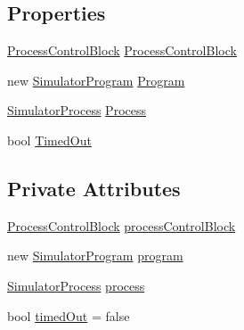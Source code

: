 \subsection*{Properties}
\begin{DoxyCompactItemize}
\item 
\hyperlink{class_c_p_u___o_s___simulator_1_1_operating___system_1_1_process_control_block}{Process\+Control\+Block} \hyperlink{class_c_p_u___o_s___simulator_1_1_operating___system_1_1_process_execution_unit_a50dccf62e2bc43d1ad30f6488d3ffa58}{Process\+Control\+Block}
\item 
new \hyperlink{class_c_p_u___o_s___simulator_1_1_c_p_u_1_1_simulator_program}{Simulator\+Program} \hyperlink{class_c_p_u___o_s___simulator_1_1_operating___system_1_1_process_execution_unit_ad5ee10381cd66c0681f1a7be91b679e4}{Program}
\item 
\hyperlink{class_c_p_u___o_s___simulator_1_1_operating___system_1_1_simulator_process}{Simulator\+Process} \hyperlink{class_c_p_u___o_s___simulator_1_1_operating___system_1_1_process_execution_unit_a869fb898b0a61e168220757d921e5bfc}{Process}
\item 
bool \hyperlink{class_c_p_u___o_s___simulator_1_1_operating___system_1_1_process_execution_unit_aa507b44c8134ffd0e9fbe702e1bf9e32}{Timed\+Out}
\end{DoxyCompactItemize}
\subsection*{Private Attributes}
\begin{DoxyCompactItemize}
\item 
\hyperlink{class_c_p_u___o_s___simulator_1_1_operating___system_1_1_process_control_block}{Process\+Control\+Block} \hyperlink{class_c_p_u___o_s___simulator_1_1_operating___system_1_1_process_execution_unit_ae2624c872da8f348b1a9fcba8d6734cf}{process\+Control\+Block}
\item 
new \hyperlink{class_c_p_u___o_s___simulator_1_1_c_p_u_1_1_simulator_program}{Simulator\+Program} \hyperlink{class_c_p_u___o_s___simulator_1_1_operating___system_1_1_process_execution_unit_ab82d2f53e3b27f272a0c5a9cc6222e9d}{program}
\item 
\hyperlink{class_c_p_u___o_s___simulator_1_1_operating___system_1_1_simulator_process}{Simulator\+Process} \hyperlink{class_c_p_u___o_s___simulator_1_1_operating___system_1_1_process_execution_unit_a0a8944c15b618210fe91444a755991ca}{process}
\item 
bool \hyperlink{class_c_p_u___o_s___simulator_1_1_operating___system_1_1_process_execution_unit_ad48af599eaa4929c947241f3d8bd754e}{timed\+Out} = false
\end{DoxyCompactItemize}


